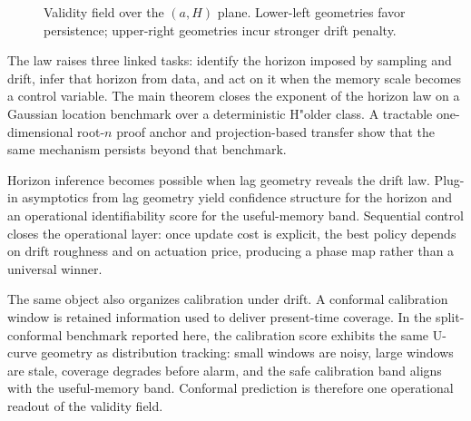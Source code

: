 \begin{figure}[!t]
\centering
{}
\caption{Validity field over the $(a,H)$ plane. Lower-left geometries favor
persistence; upper-right geometries incur stronger drift penalty.}
\label{fig:validity_field}
\end{figure}

The law raises three linked tasks: identify the horizon imposed by sampling and
drift, infer that horizon from data, and act on it when the memory scale becomes
a control variable. The main theorem closes the exponent of the horizon law on a
Gaussian location benchmark over a deterministic H"older class. A tractable
one-dimensional root-$n$ proof anchor and projection-based transfer show that the
same mechanism persists beyond that benchmark.

Horizon inference becomes possible when lag geometry reveals the drift law.
Plug-in asymptotics from lag geometry yield confidence structure for the horizon
and an operational identifiability score for the useful-memory band. Sequential
control closes the operational layer: once update cost is explicit, the best
policy depends on drift roughness and on actuation price, producing a phase map
rather than a universal winner.

The same object also organizes calibration under drift. A conformal calibration
window is retained information used to deliver present-time coverage. In the
split-conformal benchmark reported here, the calibration score exhibits the same
U-curve geometry as distribution tracking: small windows are noisy, large
windows are stale, coverage degrades before alarm, and the safe calibration band
aligns with the useful-memory band. Conformal prediction is therefore one
operational readout of the validity field.
